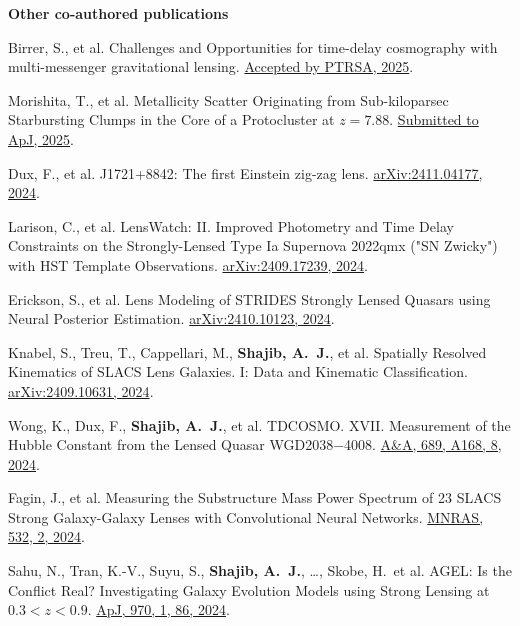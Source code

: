\documentclass[margin, line]{res}
\begin{document}
\begin{resume}
\textbf{Other co-authored publications}
\begin{etaremune}
	\item Birrer, S., et al. Challenges and Opportunities for time-delay cosmography with multi-messenger gravitational lensing. \href{https://ui.adsabs.harvard.edu/abs/2025arXiv250204472B/abstract}{Accepted by PTRSA, 2025}.
	\item Morishita, T., et al. Metallicity Scatter Originating from Sub-kiloparsec Starbursting Clumps in the Core of a Protocluster at $z=7.88$. \href{https://ui.adsabs.harvard.edu/abs/2025arXiv250111879M/abstract}{Submitted to ApJ, 2025}.
	\item Dux, F., et al. J1721+8842: The first Einstein zig-zag lens. \href{https://ui.adsabs.harvard.edu/abs/2024arXiv241104177D/abstract}{arXiv:2411.04177, 2024}.
	\item Larison, C., et al. LensWatch: II. Improved Photometry and Time Delay Constraints on the Strongly-Lensed Type Ia Supernova 2022qmx ("SN Zwicky") with HST Template Observations. \href{https://ui.adsabs.harvard.edu/abs/2024arXiv240917239L/abstract}{arXiv:2409.17239, 2024}.
	\item Erickson, S., et al. Lens Modeling of STRIDES Strongly Lensed Quasars using Neural Posterior Estimation. \href{https://ui.adsabs.harvard.edu/abs/2024arXiv241010123E/abstract}{arXiv:2410.10123, 2024}.
	\item Knabel, S., Treu, T., Cappellari, M., \textbf{Shajib, A.~J.}, et al. Spatially Resolved Kinematics of SLACS Lens Galaxies. I: Data and Kinematic Classification. \href{https://ui.adsabs.harvard.edu/abs/2024arXiv240910631K/abstract}{arXiv:2409.10631, 2024}.
	\item Wong, K., Dux, F., \textbf{Shajib, A.~J.}, et al. TDCOSMO. XVII. Measurement of the Hubble Constant from the Lensed Quasar WGD2038$-$4008. \href{https://ui.adsabs.harvard.edu/abs/2024arXiv240602683W/abstract}{A\&A, 689, A168, 8, 2024}.
	\item Fagin, J., et al. Measuring the Substructure Mass Power Spectrum of 23 SLACS Strong Galaxy-Galaxy Lenses with Convolutional Neural Networks. \href{https://ui.adsabs.harvard.edu/abs/2024arXiv240313881F/abstract}{MNRAS, 532, 2, 2024}.
	\item Sahu, N., Tran, K.-V., Suyu, S., \textbf{Shajib, A.~J.}, \dots, {Skobe, H.}\mentee\ et al. AGEL: Is the Conflict Real? Investigating Galaxy Evolution Models using Strong Lensing at $0.3 < z < 0.9$. \href{https://ui.adsabs.harvard.edu/abs/2024arXiv240515427S/abstract}{ApJ, 970, 1, 86, 2024}.

\end{etaremune}
\end{resume}
\end{document}
